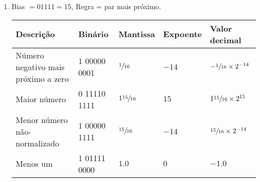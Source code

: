 \begin{enumerate}
    \item Bias $= 01111 = 15$, Regra = {\color{red}par mais próximo}.
    \begin{table}[H]
        \begin{tabular}{|l|l|l|l|l|}
            \hline
            \textbf{Descrição}  &
            \textbf{Binário}    &
            \textbf{Mantissa}   &
            \textbf{Expoente}   &
            \textbf{Valor decimal} \\\hline
            Número negativo mais próximo a zero
            & 1 00000 0001 & $\sfrac{1}{16}$ & $-14$ & $-\sfrac{1}{16}\times 2^{-14}$
            \\\hline
            Maior número
            & 0 11110 1111 & $1\sfrac{15}{16}$ & $15$ & $1\sfrac{15}{16}\times 2^{15}$
            \\\hline
            Menor número não-normalizado
            & 1 00000 1111 & $\sfrac{15}{16}$ & $-14$ & $\sfrac{15}{16}\times 2^{-14}$
            \\\hline
            Menos um
            & 1 01111 0000 & $1.0$ & $0$ & $-1.0$
            \\\hline
        \end{tabular}
    \end{table}

\end{enumerate}
